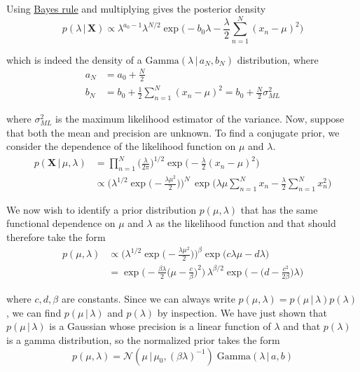   Using \hyperref[prob-thm:bayes-rule]{Bayes rule} and multiplying gives the posterior density
  \begin{equation}
    p(\lambda\,|\,\mathbf{X}) \propto \lambda^{a_0 - 1} \lambda^{N/2} \exp\bigg( -b_0 \lambda - \frac{\lambda}{2} \sum_{n=1}^N (x_n - \mu)^2 \bigg)
  \end{equation}

  which is indeed the density of a $\text{Gamma}(\lambda\,|\,a_N, b_N)$ distribution, where
  \begin{align*}
    a_N & = a_0 + \frac{N}{2} \\
    b_N & = b_0 + \frac{1}{2} \sum_{n=1}^N (x_n - \mu)^2 = b_0 + \frac{N}{2} \sigma_{ML}^2
  \end{align*}

  where $\sigma_{ML}^2$ is the maximum likelihood estimator of the variance. Now, suppose that both the mean and precision are unknown. To find a conjugate prior, we consider the dependence of the likelihood function on $\mu$ and $\lambda$.
  \begin{align*}
    p(\mathbf{X}\,|\,\mu, \lambda) & = \prod_{n=1}^N \bigg(\frac{\lambda}{2\pi}\bigg)^{1/2} \exp \bigg( -\frac{\lambda}{2} (x_n - \mu)^2 \bigg) \\
    & \propto \bigg(\lambda^{1/2} \exp \Big(-\frac{\lambda \mu^2}{2} \Big) \bigg)^N \, \exp \bigg( \lambda \mu \sum_{n=1}^N x_n - \frac{\lambda}{2} \sum_{n=1}^N x_n^2 \bigg)
  \end{align*}

  We now wish to identify a prior distribution $p(\mu, \lambda)$ that has the same functional dependence on $\mu$ and $\lambda$ as the likelihood function and that should therefore take the form
  \begin{align*}
    p(\mu, \lambda) & \propto \bigg( \lambda^{1/2} \exp \Big(-\frac{\lambda \mu^2}{2}\Big) \bigg)^\beta \exp\big( c \lambda \mu - d \lambda \big) \\
    & = \exp \bigg( -\frac{\beta \lambda}{2} \Big(\mu - \frac{c}{\beta} \Big)^2 \bigg) \, \lambda^{\beta/2} \exp \bigg(-\Big(d - \frac{c^2}{2\beta}\Big) \lambda \bigg)
  \end{align*}

  where $c, d, \beta$ are constants. Since we can always write $p(\mu, \lambda) = p(\mu\,|\,\lambda) p(\lambda)$, we can find $p(\mu\,|\,\lambda)$ and $p(\lambda)$ by inspection. We have just shown that $p(\mu \,|\, \lambda)$ is a Gaussian whose precision is a linear function of $\lambda$ and that $p(\lambda)$ is a gamma distribution, so the normalized prior takes the form
  \begin{equation}
    p(\mu, \lambda) = \mathcal{N}(\mu \,|\, \mu_0, (\beta\lambda)^{-1}) \; \text{Gamma}(\lambda\,|\,a, b)
  \end{equation}


